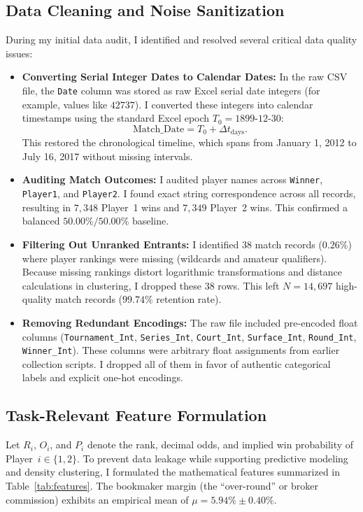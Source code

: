 \documentclass[10pt,journal]{IEEEtran}
\begin{document}
\subsection{Data Cleaning and Noise Sanitization}
During my initial data audit, I identified and resolved several critical data quality issues:
\begin{itemize}
    \item \textbf{Converting Serial Integer Dates to Calendar Dates:} In the raw CSV file, the \texttt{Date} column was stored as raw Excel serial date integers (for example, values like $42737$). I converted these integers into calendar timestamps using the standard Excel epoch $T_0 = \text{1899-12-30}$:
    \begin{equation}
        \text{Match\_Date} = T_0 + \Delta t_{\text{days}}.
    \end{equation}
    This restored the chronological timeline, which spans from January 1, 2012 to July 16, 2017 without missing intervals.
    \item \textbf{Auditing Match Outcomes:} I audited player names across \texttt{Winner}, \texttt{Player1}, and \texttt{Player2}. I found exact string correspondence across all records, resulting in $7,348$ Player~1 wins and $7,349$ Player~2 wins. This confirmed a balanced $50.00\% / 50.00\%$ baseline.
    \item \textbf{Filtering Out Unranked Entrants:} I identified 38 match records ($0.26\%$) where player rankings were missing (wildcards and amateur qualifiers). Because missing rankings distort logarithmic transformations and distance calculations in clustering, I dropped these 38 rows. This left $N = 14{,}697$ high-quality match records ($99.74\%$ retention rate).
    \item \textbf{Removing Redundant Encodings:} The raw file included pre-encoded float columns (\texttt{Tournament\_Int}, \texttt{Series\_Int}, \texttt{Court\_Int}, \texttt{Surface\_Int}, \texttt{Round\_Int}, \texttt{Winner\_Int}). These columns were arbitrary float assignments from earlier collection scripts. I dropped all of them in favor of authentic categorical labels and explicit one-hot encodings.
\end{itemize}

\subsection{Task-Relevant Feature Formulation}
Let $R_i$, $O_i$, and $P_i$ denote the rank, decimal odds, and implied win probability of Player~$i \in \{1, 2\}$. To prevent data leakage while supporting predictive modeling and density clustering, I formulated the mathematical features summarized in Table~\ref{tab:features}. The bookmaker margin (the ``over-round'' or broker commission) exhibits an empirical mean of $\mu = 5.94\% \pm 0.40\%$.
\end{document}
